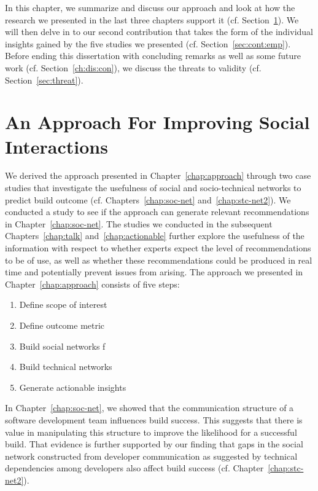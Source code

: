 \label{chap:disc}
\vspace{-5pt}
In this chapter, we summarize and discuss our approach and look at how the research we presented in the last three chapters support it (cf. Section~\ref{ch:dis:app}).
We will then delve in to our second contribution that takes the form of the individual insights gained by the five studies we presented (cf. Section~\ref{sec:cont:emp}).
Before ending this dissertation with concluding remarks as well as some future work (cf. Section~\ref{ch:dis:con}), we discuss the threats to validity (cf. Section~\ref{sec:threat}).

\vspace{-5pt}
\section{An Approach For Improving Social Interactions}
\label{ch:dis:app}
\vspace{-5pt}
We derived the approach presented in Chapter~\ref{chap:approach} through two case studies that investigate the usefulness of social and socio-technical networks to predict build outcome (cf. Chapters~\ref{chap:soc-net} and~\ref{chap:stc-net2}).
We conducted a study to see if the approach can generate relevant recommendations in Chapter~\ref{chap:soc-net}.
The studies we conducted in the subsequent Chapters~\ref{chap:talk} and~\ref{chap:actionable} further explore the usefulness of the information with respect to whether experts expect the level of recommendations to be of use, as well as whether these recommendations could be produced in real time and potentially prevent issues from arising.
The approach we presented in Chapter~\ref{chap:approach} consists of five steps:

\begin{enumerate}
\item Define scope of interest
\item Define outcome metric
\item Build social networks  f
\item Build technical networks
\item Generate actionable insights
\end{enumerate}

In Chapter~\ref{chap:soc-net}, we showed that the communication structure of a software development team influences build success.
This suggests that there is value in manipulating this structure to improve the likelihood for a successful build.
That evidence is further supported by our finding that gaps in the social network constructed from developer communication as suggested by technical dependencies among developers also affect build success (cf. Chapter~\ref{chap:stc-net2}).

